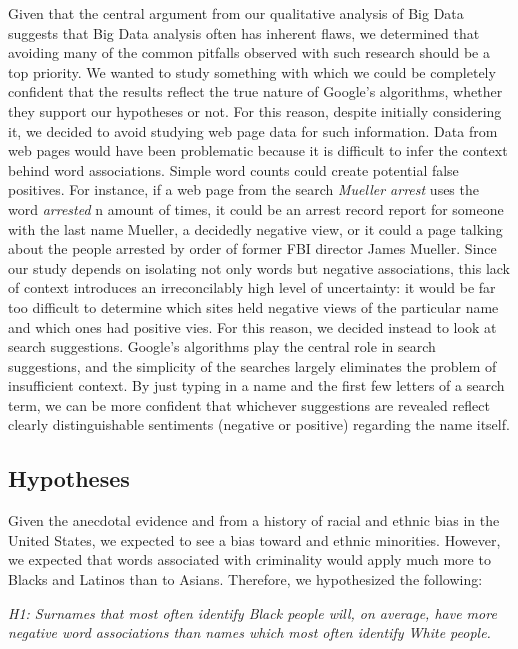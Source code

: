 \documentclass[sigconf]{acmart}
\begin{document}
Given that the central argument from our qualitative analysis of Big Data suggests that Big Data analysis often has inherent flaws, we determined that avoiding many of the common pitfalls observed with such research should be a top priority. We wanted to study something with which we could be completely confident that the results reflect the true nature of Google's algorithms, whether they support our hypotheses or not. For this reason, despite initially considering it, we decided to avoid studying web page data for such information. Data from web pages would have been problematic because it is difficult to infer the context behind word associations. Simple word counts could create potential false positives. For instance, if a web page from the search {\em Mueller arrest} uses the word {\em arrested} n amount of times, it could be an arrest record report for someone with the last name Mueller, a decidedly negative view, or it could a page talking about the people arrested by order of former FBI director James Mueller. Since our study depends on isolating not only words but negative associations, this lack of context introduces an irreconcilably high level of uncertainty: it would be far too difficult to determine which sites held negative views of the particular name and which ones had positive vies. For this reason, we decided instead to look at search suggestions. Google's algorithms play the central role in search suggestions, and the simplicity of the searches largely eliminates the problem of insufficient context. By just typing in a name and the first few letters of a search term, we can be more confident that whichever suggestions are revealed reflect clearly distinguishable sentiments (negative or positive) regarding the name itself.

\subsection{Hypotheses}

Given the anecdotal evidence and from a history of racial and ethnic bias in the United States, we expected to see a bias toward and ethnic minorities. However, we expected that words associated with criminality would apply much more to Blacks and Latinos than to Asians. Therefore, we hypothesized the following: \\

\vspace{2mm}

{\em H1: Surnames that most often identify Black people will, on average, have more negative word associations than names which most often identify White people.} \\
\end{document}

